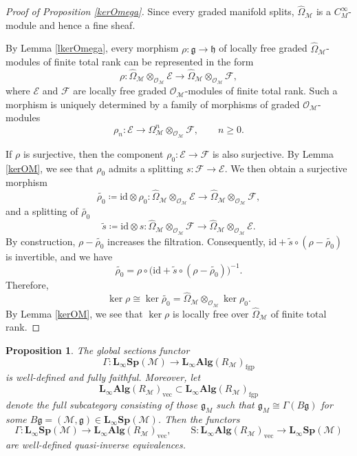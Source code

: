 \documentclass[12pt]{amsart}
\newtheorem{prop}[defn]{Proposition}
\numberwithin{equation}{section}
\theoremstyle{plain}
\newcommand{\fg}{\mathfrak{g}}
\newcommand{\fh}{\mathfrak{h}}
\newcommand{\sE}{\mathcal{E}}
\newcommand{\sF}{\mathcal{F}}
\newcommand{\sM}{\mathcal{M}}
\newcommand{\sO}{\mathcal{O}}
\newcommand{\id}{\mathrm{id}}
\newcommand{\sh}{\mathrm{S}}
\newcommand{\wOmega}{\widehat{\Omega}}
\begin{document}
	\begin{proof}[Proof of Proposition \ref{kerOmega}]
		Since every graded manifold splits, $\wOmega_\sM$ is a $C^\infty_M$-module and hence a fine sheaf.
		
	    By Lemma \ref{lkerOmega}, every morphism $\rho\colon \fg \to \fh$ of locally free graded $\wOmega_\sM$-modules of finite total rank can be represented in the form
		\[
		\rho\colon \wOmega_\sM \otimes_{\sO_\sM} \sE \longrightarrow \wOmega_\sM \otimes_{\sO_\sM} \sF,
		\]
		where $\sE$ and $\sF$ are locally free graded $\sO_\sM$-modules of finite total rank. Such a morphism is uniquely determined by a family of morphisms of graded $\sO_\sM$-modules
		\[
		\rho_n\colon \sE \longrightarrow \Omega^n_\sM \otimes_{\sO_\sM} \sF, \qquad n \ge 0.
		\]
		
		If $\rho$ is surjective, then the component $\rho_0\colon \sE \rightarrow \sF$ is also surjective. By Lemma \ref{kerOM}, we see that $\rho_0$ admits a splitting $s\colon \sF \rightarrow \sE$. We then obtain a surjective morphism
		\[
		\widetilde{\rho_0} \coloneqq \id \otimes \rho_0 \colon \wOmega_\sM \otimes_{\sO_\sM} \sE \longrightarrow \wOmega_\sM \otimes_{\sO_\sM} \sF,
		\]
		and a splitting of $\widetilde{\rho_0}$
		\[
		\widetilde{s} \coloneqq \id \otimes s \colon \wOmega_\sM \otimes_{\sO_\sM} \sF \longrightarrow \wOmega_\sM \otimes_{\sO_\sM} \sE.
		\]
		By construction, $\rho - \widetilde{\rho_0}$ increases the filtration. Consequently, $\id + \widetilde{s} \circ (\rho - \widetilde{\rho_0})$ is invertible, and we have
		\[
		\widetilde{\rho_0} = \rho \circ \bigl(\id + \widetilde{s} \circ (\rho - \widetilde{\rho_0})\bigr)^{-1}.
		\]
		Therefore,
		\[
		\ker \rho \cong \ker \widetilde{\rho_0} = \wOmega_\sM \otimes_{\sO_\sM} \ker \rho_0.
		\]
		By Lemma \ref{kerOM}, we see that $\ker \rho$ is locally free over $\wOmega_\sM$ of finite total rank. 
	\end{proof}
	
	\begin{prop}\label{gsf}
		The global sections functor
		\[
		\Gamma\colon \mathbf{L_\infty Sp}(\sM) \longrightarrow \mathbf{L_\infty Alg}(R_\sM)_{\mathrm{fgp}}
		\]
		is well-defined and fully faithful. Moreover, let 
		\[
		\mathbf{L_\infty Alg}(R_\sM)_{\mathrm{vec}} \subset \mathbf{L_\infty Alg}(R_\sM)_{\mathrm{fgp}}
		\]
		denote the full subcategory consisting of those $\fg_M$ such that $\fg_M \cong \Gamma(B\fg)$ for some $B\fg=(\sM, \fg) \in \mathbf{L_\infty Sp}(\sM)$. Then the functors
		\[
		\Gamma \colon \mathbf{L_\infty Sp}(\sM) \longrightarrow \mathbf{L_\infty Alg}(R_\sM)_{\mathrm{vec}}, \qquad
		\sh \colon \mathbf{L_\infty Alg}(R_\sM)_{\mathrm{vec}} \longrightarrow \mathbf{L_\infty Sp}(\sM)
		\]
		are well-defined quasi-inverse equivalences.
	\end{prop}
	
\end{document}
